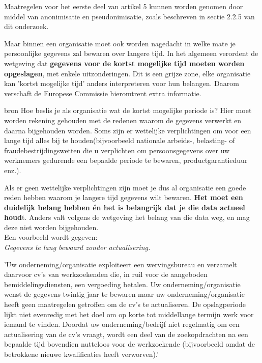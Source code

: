 Maatregelen voor het eerste deel van artikel 5 kunnen worden genomen door middel van anonimisatie en pseudonimisatie, zoals beschreven in sectie 2.2.5 van dit onderzoek. 

Maar binnen een organisatie moet ook worden nagedacht in welke mate je persoonlijke gegevens zal bewaren over langere tijd. In het algemeen verordent de wetgeving dat \textbf{gegevens voor de kortst mogelijke tijd moeten worden opgeslagen}, met enkele uitzonderingen. Dit is een grijze zone, elke organisatie kan 'kortst mogelijke tijd' anders interpreteren voor hun belangen. Daarom verschaft de Europese Commissie hieromtrent extra informatie. 


bron %
Hoe beslis je als organisatie wat de kortst mogelijke periode is? Hier moet worden rekening gehouden met de redenen waarom de gegevens verwerkt en daarna bijgehouden worden. Soms zijn er wettelijke verplichtingen om voor een lange tijd alles bij te houden(bijvoorbeeld nationale arbeids-, belasting- of fraudebestrijdingswetten die u verplichten om persoonsgegevens over uw werknemers gedurende een bepaalde periode te bewaren, productgarantieduur enz.). 

Als er geen wettelijke verplichtingen zijn moet je dus al organisatie een goede reden hebben waarom je langere tijd gegevens wilt bewaren. \textbf{Het moet een duidelijk belang hebben én het is belangrijk dat je die data actueel houd}t. Anders valt volgens de wetgeving het belang van die data weg, en mag deze niet worden bijgehouden. 
\\ Een voorbeeld wordt gegeven: 
\\ \textit{Gegevens te lang bewaard zonder actualisering.}

\setlength{\leftskip}{1cm}
'Uw onderneming/organisatie exploiteert een wervingsbureau en verzamelt daarvoor cv's van werkzoekenden die, in ruil voor de aangeboden bemiddelingsdiensten, een vergoeding betalen. Uw onderneming/organisatie wenst de gegevens twintig jaar te bewaren maar uw onderneming/organisatie heeft geen maatregelen getroffen om de cv’s te actualiseren. De opslagperiode lijkt niet evenredig met het doel om op korte tot middellange termijn werk voor iemand te vinden. Doordat uw onderneming/bedrijf niet regelmatig om een actualisering van de cv’s vraagt, wordt een deel van de zoekopdrachten na een bepaalde tijd bovendien nutteloos voor de werkzoekende (bijvoorbeeld omdat de betrokkene nieuwe kwalificaties heeft verworven).'

